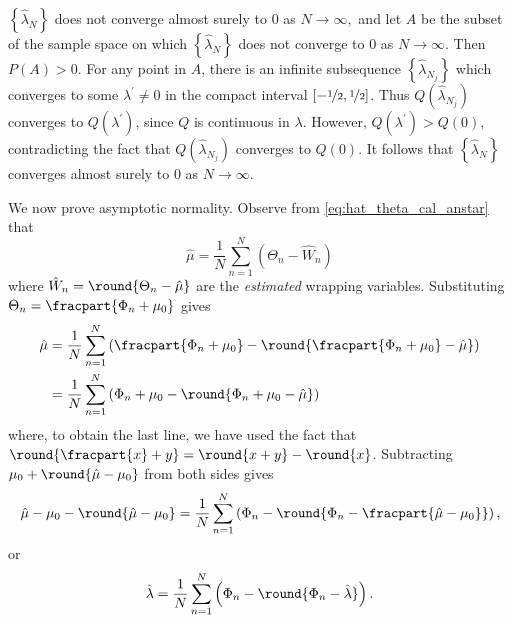 \documentclass[journal]{IEEEtran}
\begin{document}
\begin{IEEEproof}
$\left\{ \hat{\lambda}_{N}\right\} $ does not converge almost surely to $0$ as $N\rightarrow\infty,$ and let $A$ be the subset of the sample space on which $\left\{  \hat{\lambda}_{N}\right\}  $ does not converge to 0 as $N\rightarrow\infty$. Then $P\left(  A\right)  >0$.  For any point in $A$, there is an infinite subsequence $\left\{  \hat{\lambda}_{N_{j}}\right\}$ which converges to some $\lambda^{\prime}\neq0$ in the compact interval $[-\nicefrac{1}{2}, \nicefrac{1}{2}]$.  Thus $Q\left(\hat{\lambda}_{N_{j}}\right)$ converges to $Q\left(\lambda^{\prime}\right)$, since $Q$ is continuous in $\lambda$.  However, $Q\left(\lambda^{\prime}\right) > Q\left(  0\right)$, contradicting the fact that $Q\left( \hat{\lambda}_{N_{j}}\right)  $ converges to $Q(0)$.  It follows that $\left\{\hat{\lambda}_{N}\right\}$ converges almost
surely to $0$ as $N\rightarrow\infty$.

We now prove asymptotic normality. Observe from \eqref{eq:hat_theta_cal_anstar} that
\[
\hat{\mu} = \frac{1}{N}\sum_{n=1}^{N}{\left( \Theta_n - \hat{W}_n \right)}
\]
where $\hat{W}_n = \round{\Theta_n - \hat{\mu}}$ are the \emph{estimated} wrapping variables. Substituting $\Theta_n = \fracpart{\Phi_n + \mu_0}$ gives
\begin{align*}
\hat{\mu} &= %
\frac{1}{N}\sum_{n=1}^{N} \left( \fracpart{\Phi_n + \mu_0} - \round{ \fracpart{\Phi_n + \mu_0} - \hat{\mu}} \right) \\
&= \frac{1}{N}\sum_{n=1}^{N} \left( \Phi_n + \mu_0 - \round{ \Phi_n + \mu_0 - \hat{\mu}} \right)
\end{align*}
where, to obtain the last line, we have used the fact that $\round{\fracpart{x} + y} = \round{x + y} - \round{x}$. Subtracting $\mu_0 + \round{\hat{\mu} - \mu_0}$ from both sides gives
\[
\hat{\mu} - \mu_0 - \round{\hat{\mu} - \mu_0} = \frac{1}{N}\sum_{n=1}^{N} \left( \Phi_n - \round{ \Phi_n - \fracpart{\hat{\mu} - \mu_0}} \right),
\]
or
\[
\hat{\lambda} = \frac{1}{N}\sum_{n=1}^{N} \left( \Phi_n - \round{ \Phi_n - \hat{\lambda} }\right).
\]


\end{IEEEproof}
\end{document}
